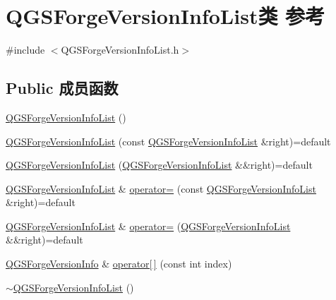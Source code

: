 \hypertarget{class_q_g_s_forge_version_info_list}{}\section{Q\+G\+S\+Forge\+Version\+Info\+List类 参考}
\label{class_q_g_s_forge_version_info_list}


{\ttfamily \#include $<$Q\+G\+S\+Forge\+Version\+Info\+List.\+h$>$}

\subsection*{Public 成员函数}
\begin{DoxyCompactItemize}
\item 
\mbox{\hyperlink{class_q_g_s_forge_version_info_list_a793adc40a37d1076532a7702949d8b87}{Q\+G\+S\+Forge\+Version\+Info\+List}} ()
\item 
\mbox{\hyperlink{class_q_g_s_forge_version_info_list_aa1a10fb3cdaebde8ba578f5d40865f65}{Q\+G\+S\+Forge\+Version\+Info\+List}} (const \mbox{\hyperlink{class_q_g_s_forge_version_info_list}{Q\+G\+S\+Forge\+Version\+Info\+List}} \&right)=default
\item 
\mbox{\hyperlink{class_q_g_s_forge_version_info_list_a37d74926de5ef5828b74e8dabddc3712}{Q\+G\+S\+Forge\+Version\+Info\+List}} (\mbox{\hyperlink{class_q_g_s_forge_version_info_list}{Q\+G\+S\+Forge\+Version\+Info\+List}} \&\&right)=default
\item 
\mbox{\hyperlink{class_q_g_s_forge_version_info_list}{Q\+G\+S\+Forge\+Version\+Info\+List}} \& \mbox{\hyperlink{class_q_g_s_forge_version_info_list_a518ee8ba5cdd2a1173aea5fe0677df59}{operator=}} (const \mbox{\hyperlink{class_q_g_s_forge_version_info_list}{Q\+G\+S\+Forge\+Version\+Info\+List}} \&right)=default
\item 
\mbox{\hyperlink{class_q_g_s_forge_version_info_list}{Q\+G\+S\+Forge\+Version\+Info\+List}} \& \mbox{\hyperlink{class_q_g_s_forge_version_info_list_a00a2c7601c752b54956198b911a5842b}{operator=}} (\mbox{\hyperlink{class_q_g_s_forge_version_info_list}{Q\+G\+S\+Forge\+Version\+Info\+List}} \&\&right)=default
\item 
\mbox{\hyperlink{class_q_g_s_forge_version_info}{Q\+G\+S\+Forge\+Version\+Info}} \& \mbox{\hyperlink{class_q_g_s_forge_version_info_list_a1faecfc10e24abe75474fa13132c0bbc}{operator\mbox{[}$\,$\mbox{]}}} (const int index)
\item 
\mbox{\hyperlink{class_q_g_s_forge_version_info_list_ab518ca89a61f729c9d2a734f63541b00}{$\sim$\+Q\+G\+S\+Forge\+Version\+Info\+List}} ()

\end{DoxyCompactItemize}

